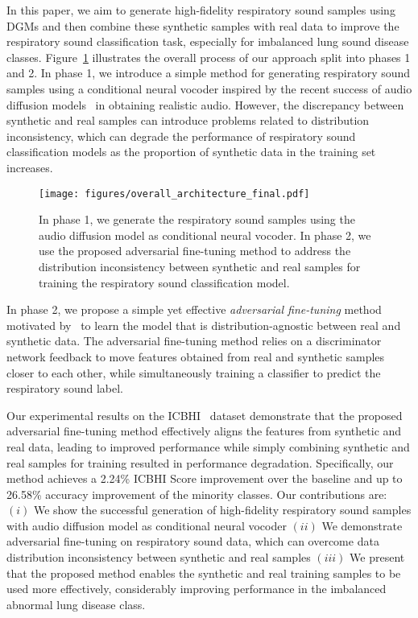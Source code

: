 \documentclass{article}
\begin{document}
In this paper, we aim to generate high-fidelity respiratory sound samples using DGMs and then combine these synthetic samples with real data to improve the respiratory sound classification task, especially for imbalanced lung sound disease classes.
Figure~\ref{fig:overview} illustrates the overall process of our approach split into phases 1 and 2.
In phase 1, we introduce a simple method for generating respiratory sound samples using a conditional neural vocoder inspired by the recent success of audio diffusion models~\cite{ho2020denoising, kong2020diffwave} in obtaining realistic audio.
However, the discrepancy between synthetic and real samples can introduce problems related to distribution inconsistency,
which can degrade the performance of respiratory sound classification models as the proportion of synthetic data in the training set increases.
\begin{figure}
    \centering
    \texttt{[image: figures/overall\_architecture\_final.pdf]} 
    \caption{In phase 1, we generate the respiratory sound samples using the audio diffusion model as conditional neural vocoder. In phase 2, we use the proposed adversarial fine-tuning method to address the distribution inconsistency between synthetic and real samples for training the respiratory sound classification model.}
    \label{fig:overview}
\end{figure}
In phase 2, we propose a simple yet effective \emph{adversarial fine-tuning} method motivated by~\cite{ganin2016domain} to learn the model that is distribution-agnostic between real and synthetic data.
The adversarial fine-tuning method relies on a discriminator network feedback to move features obtained from real and synthetic samples closer to each other, while simultaneously training a classifier to predict the respiratory sound label.


Our experimental results on the ICBHI~\cite{rocha2018alpha} dataset demonstrate that the proposed adversarial fine-tuning method effectively aligns the features from synthetic and real data, leading to improved performance while simply combining synthetic and real samples for training resulted in performance degradation. 
Specifically, our method achieves a 2.24\% ICBHI Score improvement over the baseline and up to 26.58\% accuracy improvement of the minority classes.
Our contributions are: $(i)$ We show the successful generation of high-fidelity respiratory sound samples with audio diffusion model as conditional neural vocoder $(ii)$ We demonstrate adversarial fine-tuning on respiratory sound data, which can overcome data distribution inconsistency between synthetic and real samples $(iii)$ We present that the proposed method enables the synthetic and real training samples to be used more effectively, considerably improving performance in the imbalanced abnormal lung disease class.
\end{document}

